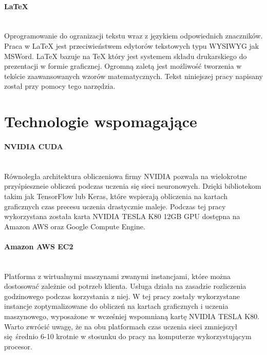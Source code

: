 \paragraph{LaTeX} \mbox{}\\
Oprogramowanie do ogranizacji tekstu wraz z językiem odpowiednich znaczników.
Praca w LaTeX jest przeciwieństwem edytorów tekstowych typu WYSIWYG jak MSWord.
LaTeX bazuje na TeX który jest systemem składu drukarskiego do prezentacji w
formie graficznej. Ogromną zaletą jest możliwość tworzenia w tekście zaawansowanych
wzorów matematycznych. Tekst niniejszej pracy napisany został przy pomocy tego narzędzia.

\section{Technologie wspomagające}

\paragraph{NVIDIA CUDA} \mbox{}\\
Równoległa architektura obliczeniowa firmy NVIDIA pozwala na wielokrotne
przyśpieszneie obliczeń podczas uczenia się sieci neuronowych. Dzięki bibliotekom
takim jak TensorFlow lub Keras, które wspierają obliczenia na kartach graficznych
czas precesu uczenia drastycznie maleje. Podczas tej pracy wykorzystana została
karta NVIDIA TESLA K80 12GB GPU dostępna na Amazon AWS oraz Google Compute Engine.

\paragraph{Amazon AWS EC2} \mbox{}\\
Platforma z wirtualnymi maszynami zwanymi instancjami, które można dostosować
zależnie od potrzeb klienta. Usługa działa na zasadzie rozliczenia godzinowego
podczas korzystania z niej. W tej pracy zostały wykorzystane instancje
zoptymalizowane do obliczeń na kartach graficznych i uczenia maszynowego,
wyposażone w wcześniej wspomnianą kartę NVIDIA TESLA K80. Warto
zwrócić uwagę, że na obu platformach czas uczenia sieci zmniejszył się średnio 6-10
krotnie w stosunku do pracy na komputerze wykorzystującym procesor.
